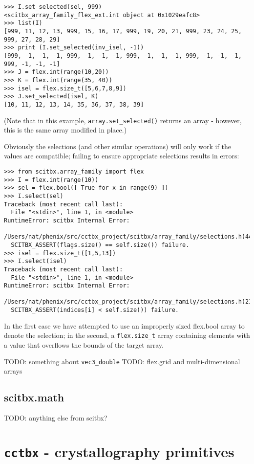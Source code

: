 \documentclass{article}
\begin{document}
\begin{Verbatim}
>>> I.set_selected(sel, 999)
<scitbx_array_family_flex_ext.int object at 0x1029eafc8>
>>> list(I)  
[999, 11, 12, 13, 999, 15, 16, 17, 999, 19, 20, 21, 999, 23, 24, 25, 999, 27, 28, 29]
>>> print (I.set_selected(inv_isel, -1))
[999, -1, -1, -1, 999, -1, -1, -1, 999, -1, -1, -1, 999, -1, -1, -1, 999, -1, -1, -1]
>>> J = flex.int(range(10,20))
>>> K = flex.int(range(35, 40))
>>> isel = flex.size_t([5,6,7,8,9])
>>> J.set_selected(isel, K)
[10, 11, 12, 13, 14, 35, 36, 37, 38, 39]
\end{Verbatim}

(Note that in this example, {\tt array.set\_selected()} returns an array -
however, this is the same array modified in place.)


Obviously the selections (and other similar operations) will only work if the
values are compatible; failing to ensure appropriate selections results in
errors:

\begin{Verbatim}
>>> from scitbx.array_family import flex
>>> I = flex.int(range(10))
>>> sel = flex.bool([ True for x in range(9) ])
>>> I.select(sel)
Traceback (most recent call last):
  File "<stdin>", line 1, in <module>
RuntimeError: scitbx Internal Error:
  /Users/nat/phenix/src/cctbx_project/scitbx/array_family/selections.h(44):
  SCITBX_ASSERT(flags.size() == self.size()) failure.
>>> isel = flex.size_t([1,5,13])
>>> I.select(isel)
Traceback (most recent call last):
  File "<stdin>", line 1, in <module>
RuntimeError: scitbx Internal Error:
  /Users/nat/phenix/src/cctbx_project/scitbx/array_family/selections.h(21):
  SCITBX_ASSERT(indices[i] < self.size()) failure.
\end{Verbatim}

In the first case we have attempted to use an improperly sized flex.bool array
to denote the selection; in the second, a {\tt flex.size\_t} array containing
elements with a value that overflows the bounds of the target array.


TODO: something about {\tt vec3\_double}
TODO: flex.grid and multi-dimensional arrays


\subsection{scitbx.math}


TODO: anything else from scitbx?


\section{{\tt cctbx} - crystallography primitives}
\end{document}
